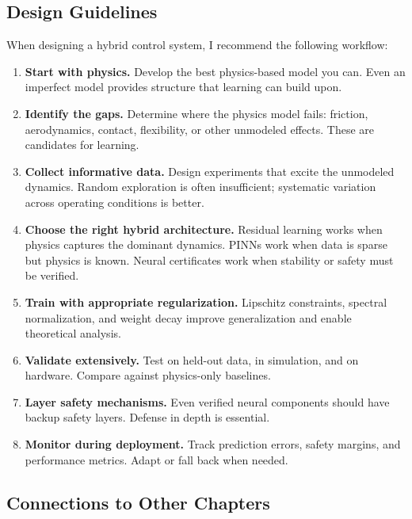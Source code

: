 \subsection{Design Guidelines}

When designing a hybrid control system, I recommend the following workflow:

\begin{enumerate}
    \item \textbf{Start with physics.} Develop the best physics-based model you can. Even an imperfect model provides structure that learning can build upon.

    \item \textbf{Identify the gaps.} Determine where the physics model fails: friction, aerodynamics, contact, flexibility, or other unmodeled effects. These are candidates for learning.

    \item \textbf{Collect informative data.} Design experiments that excite the unmodeled dynamics. Random exploration is often insufficient; systematic variation across operating conditions is better.

    \item \textbf{Choose the right hybrid architecture.} Residual learning works when physics captures the dominant dynamics. PINNs work when data is sparse but physics is known. Neural certificates work when stability or safety must be verified.

    \item \textbf{Train with appropriate regularization.} Lipschitz constraints, spectral normalization, and weight decay improve generalization and enable theoretical analysis.

    \item \textbf{Validate extensively.} Test on held-out data, in simulation, and on hardware. Compare against physics-only baselines.

    \item \textbf{Layer safety mechanisms.} Even verified neural components should have backup safety layers. Defense in depth is essential.

    \item \textbf{Monitor during deployment.} Track prediction errors, safety margins, and performance metrics. Adapt or fall back when needed.
\end{enumerate}

\subsection{Connections to Other Chapters}

